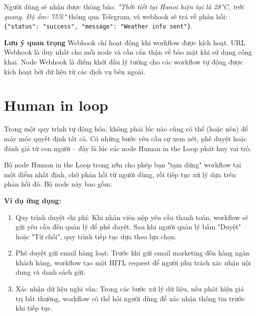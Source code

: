 Người dùng sẽ nhận được thông báo: \textit{"Thời tiết tại Hanoi hiện tại là 28°C, trời quang. Độ ẩm: 75\%"} thông qua Telegram, và webhook sẽ trả về phản hồi: \texttt{\{"status": "success", "message": "Weather info sent"\}}.

\textbf{Lưu ý quan trọng}
Webhook chỉ hoạt động khi workflow được kích hoạt. URL Webhook là duy nhất cho mỗi node và cần cẩn thận về bảo mật khi sử dụng công khai. Node Webhook là điểm khởi đầu lý tưởng cho các workflow tự động được kích hoạt bởi dữ liệu từ các dịch vụ bên ngoài.

\section{Human in loop}
Trong một quy trình tự động hóa, không phải lúc nào cũng có thể (hoặc nên) để máy móc quyết định tất cả. Có những bước yêu cầu sự xem xét, phê duyệt hoặc đánh giá từ con người – đây là lúc các node Human in the Loop phát huy vai trò.

Bộ node Human in the Loop trong n8n cho phép bạn "tạm dừng" workflow tại một điểm nhất định, chờ phản hồi từ người dùng, rồi tiếp tục xử lý dựa trên phản hồi đó. Bộ node này bao gồm:

\textbf{Ví dụ ứng dụng:}
\begin{enumerate}
    \item Quy trình duyệt chi phí: Khi nhân viên nộp yêu cầu thanh toán, workflow sẽ gửi yêu cầu đến quản lý để phê duyệt. Sau khi người quản lý bấm "Duyệt" hoặc "Từ chối", quy trình tiếp tục dựa theo lựa chọn.

    \item Phê duyệt gửi email hàng loạt: Trước khi gửi email marketing đến hàng ngàn khách hàng, workflow tạo một HITL request để người phụ trách xác nhận nội dung và danh sách gửi.

    \item Xác nhận dữ liệu nghi vấn: Trong các bước xử lý dữ liệu, nếu phát hiện giá trị bất thường, workflow có thể hỏi người dùng để xác nhận thông tin trước khi tiếp tục.
\end{enumerate}

